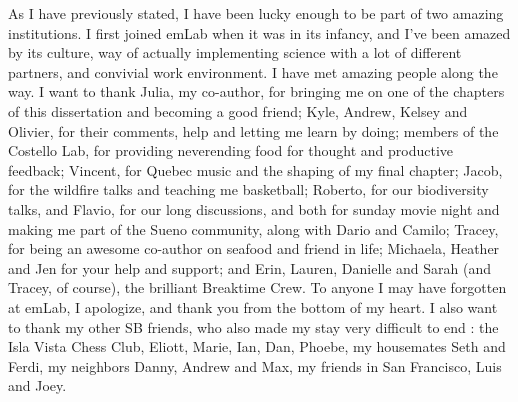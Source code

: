 As I have previously stated, I have been lucky enough to be part of two amazing institutions. I first joined emLab when it was in its infancy, and I've been amazed by its culture, way of actually implementing science with a lot of different partners, and convivial work environment. I have met amazing people along the way. I want to thank Julia, my co-author, for bringing me on one of the chapters of this dissertation and becoming a good friend; Kyle, Andrew, Kelsey and Olivier, for their comments, help and letting me learn by doing; members of the Costello Lab, for providing neverending food for thought and productive feedback; Vincent, for Quebec music and the shaping of my final chapter; Jacob, for the wildfire talks and teaching me basketball; Roberto, for our biodiversity talks, and Flavio, for our long discussions, and both for sunday movie night and making me part of the Sueno community, along with Dario and Camilo; Tracey, for being an awesome co-author on seafood and friend in life; Michaela, Heather and Jen for your help and support; and Erin, Lauren, Danielle and Sarah (and Tracey, of course), the brilliant Breaktime Crew. To anyone I may have forgotten at emLab, I apologize, and thank you from the bottom of my heart. I also want to thank my other SB friends, who also made my stay very difficult to end : the Isla Vista Chess Club, Eliott, Marie, Ian, Dan, Phoebe, my housemates Seth and Ferdi, my neighbors Danny, Andrew and Max, my friends in San Francisco, Luis and Joey. 

